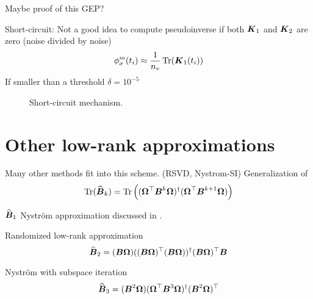 Maybe proof of this GEP?

Short-circuit: Not a good idea to compute pseudoinverse if
both $\boldsymbol{K}_1$ and $\boldsymbol{K}_2$ are zero (noise divided by noise)
\begin{equation}
    \phi_{\sigma}^m(t_i) \approx \frac{1}{n_v} \operatorname{Tr}(\boldsymbol{K}_1(t_i))
    \label{equ:3-nystrom-shortcircuit-hutchinson}
\end{equation}
If smaller than a threshold $\delta = 10^{-5}$

\begin{figure}[ht]
    \centering
    
    \caption{Short-circuit mechanism.}
    \label{fig:3-nystrom-short-circuit-mechanism}
\end{figure}


\section{Other low-rank approximations}
\label{sec:3-nystrom-other-low-rank}

Many other methods fit into this scheme. (RSVD, Nystrom-SI)
Generalization of 
\begin{equation}
    \operatorname{Tr}(\widehat{\boldsymbol{B}}_k)
        = \operatorname{Tr}\left((\boldsymbol{\Omega}^{\top} \boldsymbol{B}^k \boldsymbol{\Omega})^{\dagger} (\boldsymbol{\Omega}^{\top} \boldsymbol{B}^{k+1} \boldsymbol{\Omega}) \right)
    \label{equ:3-nystrom-}
\end{equation}

$\widehat{\boldsymbol{B}}_1$ Nystr\"om approximation discussed in .

Randomized low-rank approximation \cite{halko2011finding, tropp2023randomized}
\begin{equation}
    \widehat{\boldsymbol{B}}_2 = (\boldsymbol{B} \boldsymbol{\Omega}) ((\boldsymbol{B} \boldsymbol{\Omega})^{\top} (\boldsymbol{B} \boldsymbol{\Omega}))^{\dagger} (\boldsymbol{B} \boldsymbol{\Omega})^{\top} \boldsymbol{B}
    \label{equ:3-nystrom-RSVD}
\end{equation}

Nystr\"om with subspace iteration \cite{tropp2023randomized}
\begin{equation}
    \widehat{\boldsymbol{B}}_3 = (\boldsymbol{B}^2 \boldsymbol{\Omega}) (\boldsymbol{\Omega}^{\top} \boldsymbol{B}^3 \boldsymbol{\Omega})^{\dagger} (\boldsymbol{B}^2 \boldsymbol{\Omega})^{\top}
    \label{equ:3-nystrom-nystrom-SI}
\end{equation}
